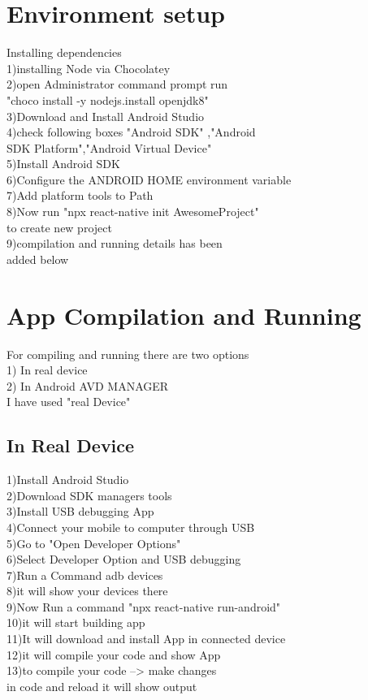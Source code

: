 \documentclass[conference]{IEEEtran}
\begin{document}
\section{Environment setup}
Installing dependencies\\
1)installing Node via Chocolatey\\
2)open Administrator command prompt run\\ 
"choco install -y nodejs.install openjdk8"\\
3)Download and Install Android Studio\\
4)check following boxes "Android SDK" ,"Android \\
SDK Platform","Android Virtual Device"\\
5)Install Android SDK\\
6)Configure the ANDROID HOME environment variable\\
7)Add platform tools to Path\\
8)Now run "npx react-native init AwesomeProject" \\
to create new project\\
9)compilation and running details has been \\
added below\\

\section{App Compilation and Running}
For compiling and running there are two options\\
1) In real device\\
2) In Android AVD MANAGER\\

I have used "real Device"\\

\subsection{In Real Device}
1)Install Android Studio\\
2)Download SDK managers tools\\
3)Install USB debugging App \\
4)Connect your mobile to computer through USB\\
5)Go to "Open Developer Options"\\
6)Select Developer Option and USB debugging\\
7)Run a Command adb devices\\
8)it will show your devices there \\
9)Now Run a command "npx react-native run-android"\\
10)it will start building  app\\
11)It will download and install App in connected device\\
12)it will compile your code and show App\\
13)to compile your code --> make changes\\
in code and reload it will show output\\
\end{document}
